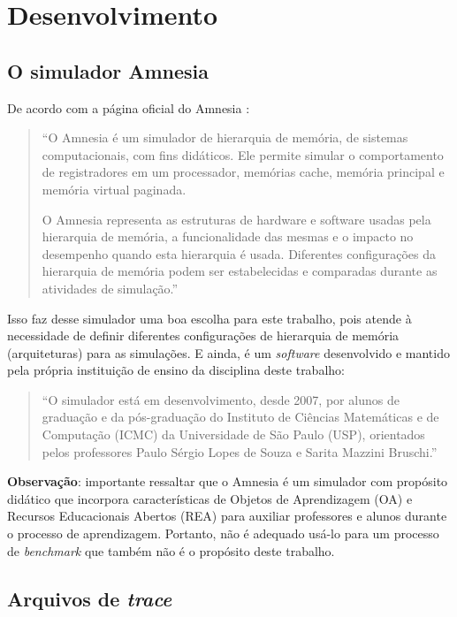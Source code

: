 \section{Desenvolvimento \label{sec:desenvolvimento}}

\subsection{O simulador Amnesia \label{subsec:amnesia}}

De acordo com a página oficial do Amnesia \cite{bib:amnesia}:
\begin{quote}``O Amnesia é um simulador de hierarquia de memória, de sistemas computacionais, com fins didáticos. Ele permite simular o comportamento de registradores em um processador, memórias cache, memória principal e memória virtual paginada.

O Amnesia representa as estruturas de hardware e software usadas pela hierarquia de memória, a funcionalidade das mesmas e o impacto no desempenho quando esta hierarquia é usada. Diferentes configurações da hierarquia de memória podem ser estabelecidas e comparadas durante as atividades de simulação.''
\end{quote}

Isso faz desse simulador uma boa escolha para este trabalho, pois atende à necessidade de definir diferentes configurações de hierarquia de memória (arquiteturas) para as simulações. E ainda, é um \textit{software} desenvolvido e mantido pela própria instituição de ensino da disciplina deste trabalho:
\begin{quote}
``O simulador está em desenvolvimento, desde 2007, por alunos de graduação e da pós-graduação do Instituto de Ciências Matemáticas e de Computação (ICMC) da Universidade de São Paulo (USP), orientados pelos professores Paulo Sérgio Lopes de Souza e Sarita Mazzini Bruschi.''
\end{quote}

\textbf{Observação}: importante ressaltar que o Amnesia é um simulador com propósito didático que incorpora características de Objetos de Aprendizagem (OA) e Recursos Educacionais Abertos (REA) para auxiliar professores e alunos durante o processo de aprendizagem. Portanto, não é adequado usá-lo para um processo de \textit{benchmark} que também não é o propósito deste trabalho.

\subsection{Arquivos de \textit{trace} \label{subsec:trace}}

